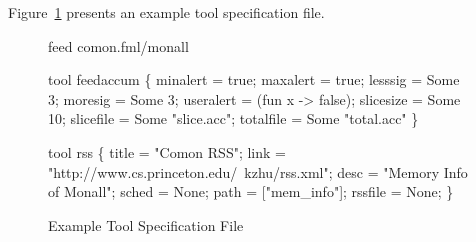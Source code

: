 
Figure~\ref{fig:toolconfigs} presents an example tool specification file.


\begin{figure}[tb]
\centering
\begin{codebox}
feed comon.fml/monall

tool feedaccum
\{
  minalert  = true;
  maxalert  = true;
  lesssig   = Some 3;
  moresig   = Some 3;
  useralert = (fun x -> false);
  slicesize = Some 10;
  slicefile = Some "slice.acc";
  totalfile = Some "total.acc"
\}

tool rss
\{
  title = "Comon RSS";
  link  = "http://www.cs.princeton.edu/~kzhu/rss.xml";
  desc  = "Memory Info of Monall";
  sched = None; 
  path  = ["mem_info"];
  rssfile = None; 
\}
\end{codebox}
\caption{Example Tool Specification File}
\label{fig:toolconfigs}
\end{figure}